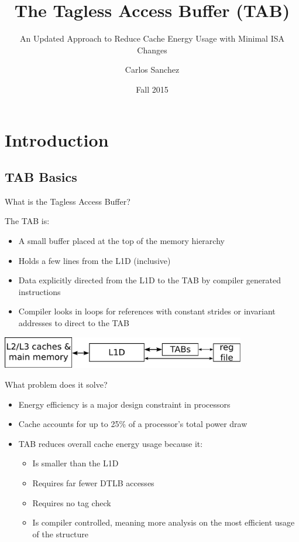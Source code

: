 \documentclass{beamer}
\title[TAB v2] %
{The Tagless Access Buffer (TAB)}
\subtitle{An Updated Approach to Reduce Cache Energy Usage with Minimal ISA Changes}
\author{Carlos Sanchez}
\institute[FSU]
{Computer Science Department\\ Florida State University}
\date{Fall 2015}
\begin{document}
 
\frame{\titlepage} 
\section{Introduction}
\subsection{TAB Basics}
\begin{frame}{What is the Tagless Access Buffer?}
   \begin{block}{The TAB is:}
      \begin{itemize}
         \item A small buffer placed at the top of the memory hierarchy
         \item Holds a few lines from the L1D (inclusive)
         \item Data explicitly directed from the L1D to the TAB by compiler 
            generated instructions
         \item Compiler looks in loops for references with constant strides
            or invariant addresses to direct to the TAB
      \end{itemize}
   \end{block}
   \begin{center}
      \includegraphics[width=0.8\textwidth]{figures/dmemhier.pdf}
   \end{center}
\end{frame}
\begin{frame}{What problem does it solve?}
   \begin{itemize}
      \item Energy efficiency is a major design constraint in processors
      \item Cache accounts for up to 25\% of a processor's total power draw
      \item TAB reduces overall cache energy usage because it:
         \begin{itemize}
            \item Is smaller than the L1D
            \item Requires far fewer DTLB accesses
            \item Requires no tag check
            \item Is compiler controlled, meaning more analysis on the most
               efficient usage of the structure
         \end{itemize}
   \end{itemize}
\end{frame}
\end{document}
